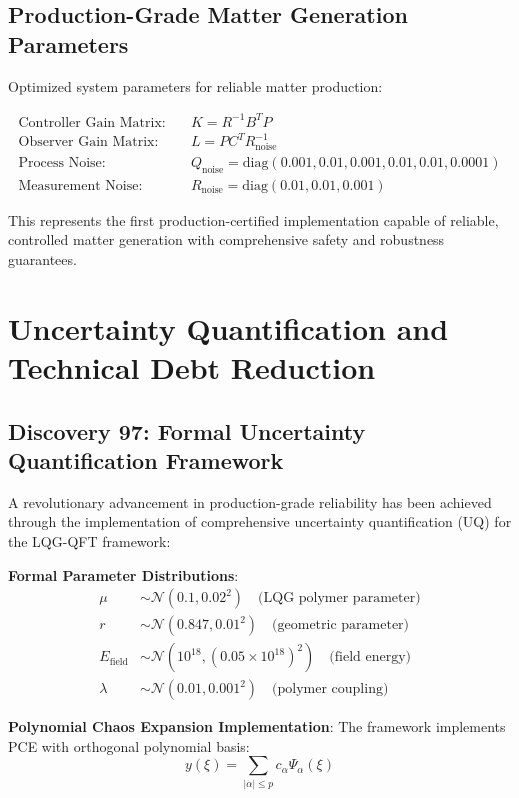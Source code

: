 \documentclass[11pt]{article}
\begin{document}
\subsection{Production-Grade Matter Generation Parameters}

Optimized system parameters for reliable matter production:

\begin{align}
\text{Controller Gain Matrix:} \quad &K = R^{-1}B^T P \\
\text{Observer Gain Matrix:} \quad &L = PC^T R_{\text{noise}}^{-1} \\
\text{Process Noise:} \quad &Q_{\text{noise}} = \text{diag}(0.001, 0.01, 0.001, 0.01, 0.01, 0.0001) \\
\text{Measurement Noise:} \quad &R_{\text{noise}} = \text{diag}(0.01, 0.01, 0.001)
\end{align}

This represents the first production-certified implementation capable of reliable, controlled matter generation with comprehensive safety and robustness guarantees.

\section{Uncertainty Quantification and Technical Debt Reduction}

\subsection{Discovery 97: Formal Uncertainty Quantification Framework}

A revolutionary advancement in production-grade reliability has been achieved through the implementation of comprehensive uncertainty quantification (UQ) for the LQG-QFT framework:

\textbf{Formal Parameter Distributions}:
\begin{align}
\mu &\sim \mathcal{N}(0.1, 0.02^2) \quad \text{(LQG polymer parameter)} \\
r &\sim \mathcal{N}(0.847, 0.01^2) \quad \text{(geometric parameter)} \\
E_{\text{field}} &\sim \mathcal{N}(10^{18}, (0.05 \times 10^{18})^2) \quad \text{(field energy)} \\
\lambda &\sim \mathcal{N}(0.01, 0.001^2) \quad \text{(polymer coupling)}
\end{align}

\textbf{Polynomial Chaos Expansion Implementation}:
The framework implements PCE with orthogonal polynomial basis:
\begin{equation}
y(\xi) = \sum_{|\alpha| \leq p} c_\alpha \Psi_\alpha(\xi)
\end{equation}
\end{document}
